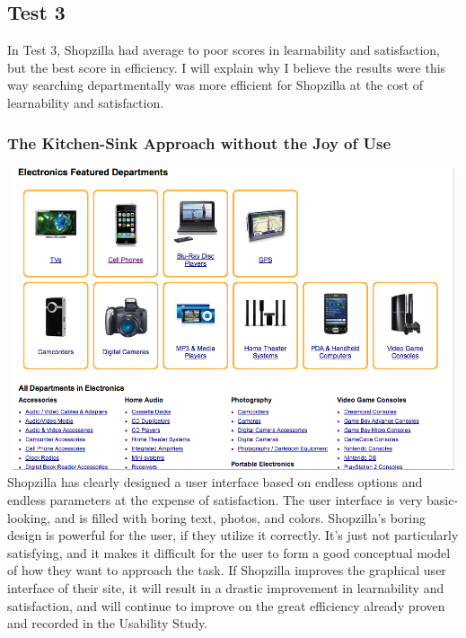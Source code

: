 \documentclass[11pt, oneside]{article}   	%
\begin{document}
\subsection{Test 3}
In Test 3, Shopzilla had average to poor scores in learnability and satisfaction, but the best score in efficiency. I will explain why I believe the results were this way searching departmentally was more efficient for Shopzilla at the cost of learnability and satisfaction.
\subsubsection{The Kitchen-Sink Approach without the Joy of Use}
\includegraphics[width=6in, height=3.5in]{Shopzilla1}
Shopzilla has clearly designed a user interface based on endless options and endless parameters at the expense of satisfaction. The user interface is very basic-looking, and is filled with boring text, photos, and colors. Shopzilla's boring design is powerful for the user, if they utilize it correctly. It's just not particularly satisfying, and it makes it difficult for the user to form a good conceptual model of how they want to approach the task. If Shopzilla improves the graphical user interface of their site, it will result in a drastic improvement in learnability and satisfaction, and will continue to improve on the great efficiency already proven and recorded in the Usability Study.
\end{document}
